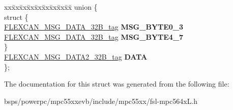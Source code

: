 \begin{DoxyCompactItemize}
\begin{tabbing}
\end{tabbing}\item 
\mbox{\label{structFLEXCAN__MB__struct__tag_abe8f7859bdf2a4aad8aff689aa2a2cdb}} 
\begin{tabbing}
xx\=xx\=xx\=xx\=xx\=xx\=xx\=xx\=xx\=\kill
union \{\\
\mbox{\label{unionFLEXCAN__MB__struct__tag_1_1_0D2344_a89349aba61a50ee64f220fdd6013c6b1}} 
\>struct \{\\
\>\>\mbox{\hyperlink{unionFLEXCAN__MSG__DATA__32B__tag}{FLEXCAN\_MSG\_DATA\_32B\_tag}} {\bfseries MSG\_BYTE0\_3}\\
\>\>\mbox{\hyperlink{unionFLEXCAN__MSG__DATA__32B__tag}{FLEXCAN\_MSG\_DATA\_32B\_tag}} {\bfseries MSG\_BYTE4\_7}\\
\>\} \\
\>\mbox{\hyperlink{unionFLEXCAN__MSG__DATA2__32B__tag}{FLEXCAN\_MSG\_DATA2\_32B\_tag}} {\bfseries DATA}\\
\}; \\

\end{tabbing}\end{DoxyCompactItemize}


The documentation for this struct was generated from the following file\+:\begin{DoxyCompactItemize}
\item 
bsps/powerpc/mpc55xxevb/include/mpc55xx/fsl-\/mpc564x\+L.\+h\end{DoxyCompactItemize}
